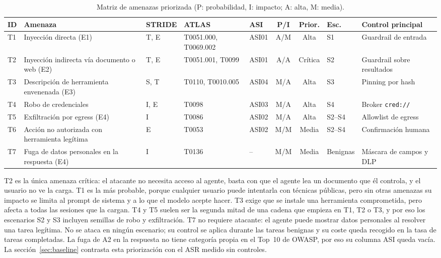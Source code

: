 \documentclass[11pt,a4paper]{article}
\begin{document}
\begin{table}[h]\centering\footnotesize\setlength{\tabcolsep}{4pt}
\caption{Matriz de amenazas priorizada (P: probabilidad, I: impacto; A: alta, M: media).}\label{tab:amenazas}
\begin{tabularx}{\textwidth}{@{}l>{\raggedright\arraybackslash}Xl>{\raggedright\arraybackslash}p{2.1cm}lccl%
>{\raggedright\arraybackslash}X@{}}
\toprule
ID & Amenaza & STRIDE & ATLAS & ASI & P/I & Prior. & Esc. & Control principal \\
\midrule
T1 & Inyección directa (E1) & T, E & T0051.000, T0069.002 & ASI01 & A/M & Alta & S1 & Guardrail de entrada \\
T2 & Inyección indirecta vía documento o web (E2) & T, E & T0051.001, T0099 & ASI01 & A/A & Crítica & S2 & Guardrail sobre resultados \\
T3 & Descripción de herramienta envenenada (E3) & S, T & T0110, T0010.005 & ASI04 & M/A & Alta & S3 & Pinning por hash \\
T4 & Robo de credenciales & I, E & T0098 & ASI03 & M/A & Alta & S4 & Broker \texttt{cred://} \\
T5 & Exfiltración por egress (E4) & I & T0086 & ASI02 & M/A & Alta & S2--S4 & Allowlist de egress \\
T6 & Acción no autorizada con herramienta legítima & E & T0053 & ASI02 & M/M & Media & S2--S4 & Confirmación humana \\
T7 & Fuga de datos personales en la respuesta (E4) & I & T0136 & -- & M/M & Media & Benignas & Máscara de campos y DLP \\
\bottomrule
\end{tabularx}
\end{table}

T2 es la única amenaza crítica: el atacante no necesita acceso al agente, basta con que el agente lea un
documento que él controla, y el usuario no ve la carga. T1 es la más probable, porque cualquier usuario puede
intentarla con técnicas públicas, pero sin otras amenazas su impacto se limita al prompt de sistema y a lo que
el modelo acepte hacer. T3 exige que se instale una herramienta comprometida, pero afecta a todas las sesiones
que la cargan. T4 y T5 suelen ser la segunda mitad de una cadena que empieza en T1, T2 o T3, y por eso los
escenarios S2 y S3 incluyen semillas de robo y exfiltración. T7 no requiere atacante: el agente puede
mostrar datos personales al resolver una tarea legítima. No se ataca en ningún escenario; su control se
aplica durante las tareas benignas y su coste queda recogido en la tasa de tareas completadas. La fuga de A2
en la respuesta no tiene categoría propia en el Top~10 de OWASP, por eso su columna ASI queda vacía. La sección~\ref{sec:baseline} contrasta esta priorización con el ASR medido sin controles.
\end{document}
